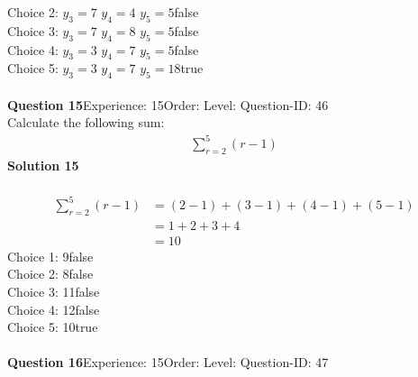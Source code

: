 \documentclass{article}
\begin{document}
Choice 2: \hspace{20pt}$y_3=7 \,\, y_4=4 \,\, y_5=5 $\hspace{20pt}false\\
Choice 3: \hspace{20pt}$y_3=7 \,\, y_4=8 \,\, y_5=5 $\hspace{20pt}false\\
Choice 4: \hspace{20pt}$y_3=3 \,\, y_4=7 \,\, y_5=5 $\hspace{20pt}false\\
Choice 5: \hspace{20pt}$y_3=3 \,\, y_4=7 \,\, y_5=18 $\hspace{20pt}true\\
\\[4pt]
\noindent\textbf{Question 15}\hspace{20pt}Experience: 15\hspace{20pt}Order: \hspace{20pt}Level: \hspace{20pt}Question-ID: 46\\[2pt]
Calculate the following sum:
\begin{align*}
\sum_{r=2}^{5} (r-1)
\end{align*}
\noindent\textbf{Solution 15}\\[2pt]
\\[-35pt]\begin{align*}
\sum_{r=2}^{5} (r-1)&=(2-1)+(3-1)+(4-1)+(5-1)\\[2pt]
&=1+2+3+4\\[2pt]
&=10
\end{align*}
Choice 1: \hspace{20pt}9\hspace{20pt}false\\
Choice 2: \hspace{20pt}8\hspace{20pt}false\\
Choice 3: \hspace{20pt}11\hspace{20pt}false\\
Choice 4: \hspace{20pt}12\hspace{20pt}false\\
Choice 5: \hspace{20pt}10\hspace{20pt}true\\
\\[4pt]
\noindent\textbf{Question 16}\hspace{20pt}Experience: 15\hspace{20pt}Order: \hspace{20pt}Level: \hspace{20pt}Question-ID: 47\\[2pt]
\end{document}
